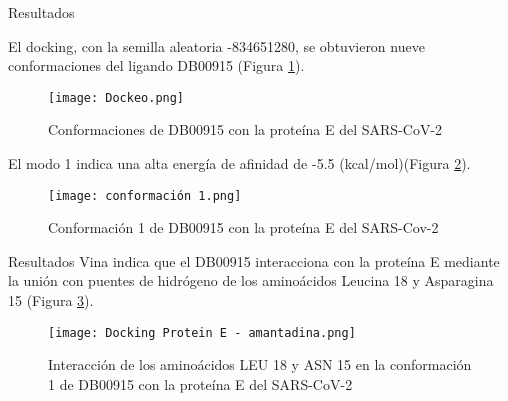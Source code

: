 \documentclass{beamer}
\begin{document}
%

\begin{frame}{Resultados}


El docking, con la semilla aleatoria -834651280, se obtuvieron nueve conformaciones del ligando DB00915 (Figura \ref{dock}).
    
    
    
\begin{figure}
    \centering
    \texttt{[image: Dockeo.png]}
    \caption{Conformaciones de DB00915 con la proteína E del SARS-CoV-2}
    \label{dock}
\end{figure}     
    
    
    
\end{frame}    
    
    
    
    
\begin{frame}    
    
El modo 1 indica una alta energía de afinidad de -5.5 (kcal/mol)(Figura \ref{afinidad}).
   
 \begin{figure}
    \centering
    \texttt{[image: conformación 1.png]}
    \caption{Conformación 1 de DB00915 con la proteína E del SARS-Cov-2}
    \label{afinidad}
\end{figure} 
  

\end{frame}



\begin{frame}{Resultados}
Vina indica que el DB00915 interacciona con la proteína E mediante la unión con puentes de hidrógeno  de los aminoácidos Leucina 18 y Asparagina 15 (Figura \ref{amino}).

\begin{figure}
    \centering
    \texttt{[image: Docking Protein E - amantadina.png]}
    \caption{Interacción de los aminoácidos LEU 18 y ASN 15 en la conformación 1 de DB00915 con la proteína E del SARS-CoV-2}
    \label{amino}
\end{figure} 


\end{frame}
\end{document}
